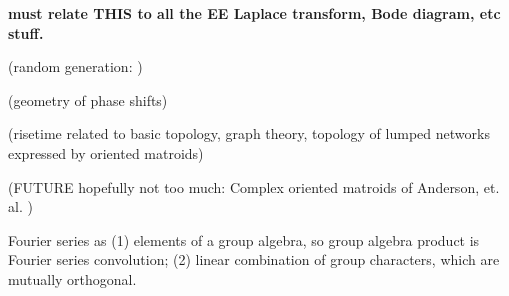 \documentclass{article}
\begin{document}
\noindent\textbf{must relate THIS to all the EE Laplace transform, 
Bode diagram, etc stuff.}

(random generation: \cite{BoltzmanSampRandCombGen})

(geometry of phase shifts)

(risetime related to basic topology, graph theory, topology of lumped
networks expressed by oriented matroids)

(FUTURE hopefully not too much: Complex oriented matroids of Anderson, et.
al. \cite{complexOM})

Fourier series as (1) elements of a group algebra, so group algebra product is
Fourier series convolution; (2) linear combination of group characters, which
are mutually orthogonal.


{}

\end{document}
